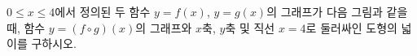 $0\le x\le 4$에서 정의된 두 함수 $y=f(x)$, $y=g(x)$의 그래프가 다음 그림과 같을 때, 함수 $y=(f\circ g)(x)$의 그래프와 $x$축, $y$축 및 직선 $x=4$로 둘러싸인 도형의 넓이를 구하시오.
\par\smallskip\begin{center}\resizebox{\ifdim\width>\linewidth\linewidth\else\width\fi}{!}{}\end{center}
